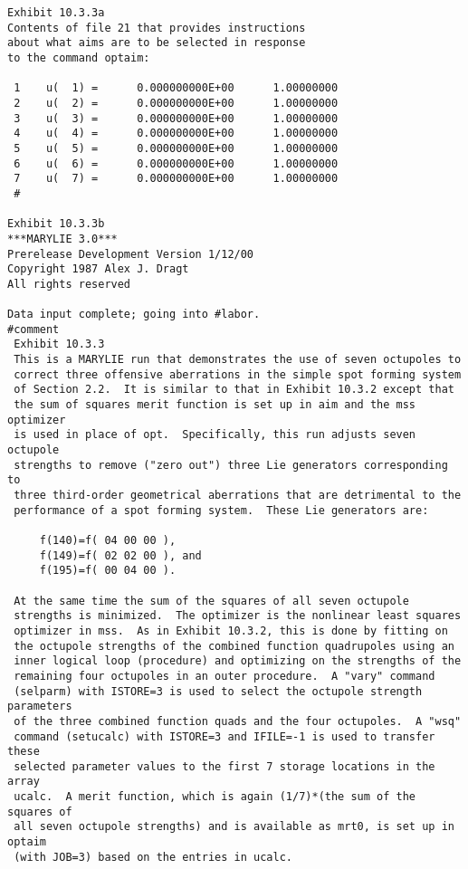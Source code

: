 \begin{footnotesize}
\begin{verbatim}
Exhibit 10.3.3a
Contents of file 21 that provides instructions
about what aims are to be selected in response
to the command optaim:

 1    u(  1) =      0.000000000E+00      1.00000000
 2    u(  2) =      0.000000000E+00      1.00000000
 3    u(  3) =      0.000000000E+00      1.00000000
 4    u(  4) =      0.000000000E+00      1.00000000
 5    u(  5) =      0.000000000E+00      1.00000000
 6    u(  6) =      0.000000000E+00      1.00000000
 7    u(  7) =      0.000000000E+00      1.00000000
 #

Exhibit 10.3.3b
***MARYLIE 3.0***
Prerelease Development Version 1/12/00
Copyright 1987 Alex J. Dragt
All rights reserved

Data input complete; going into #labor.
#comment
 Exhibit 10.3.3
 This is a MARYLIE run that demonstrates the use of seven octupoles to
 correct three offensive aberrations in the simple spot forming system
 of Section 2.2.  It is similar to that in Exhibit 10.3.2 except that
 the sum of squares merit function is set up in aim and the mss optimizer
 is used in place of opt.  Specifically, this run adjusts seven octupole
 strengths to remove ("zero out") three Lie generators corresponding to
 three third-order geometrical aberrations that are detrimental to the
 performance of a spot forming system.  These Lie generators are:

     f(140)=f( 04 00 00 ),
     f(149)=f( 02 02 00 ), and
     f(195)=f( 00 04 00 ).

 At the same time the sum of the squares of all seven octupole
 strengths is minimized.  The optimizer is the nonlinear least squares
 optimizer in mss.  As in Exhibit 10.3.2, this is done by fitting on
 the octupole strengths of the combined function quadrupoles using an
 inner logical loop (procedure) and optimizing on the strengths of the
 remaining four octupoles in an outer procedure.  A "vary" command
 (selparm) with ISTORE=3 is used to select the octupole strength parameters
 of the three combined function quads and the four octupoles.  A "wsq"
 command (setucalc) with ISTORE=3 and IFILE=-1 is used to transfer these
 selected parameter values to the first 7 storage locations in the array
 ucalc.  A merit function, which is again (1/7)*(the sum of the squares of
 all seven octupole strengths) and is available as mrt0, is set up in optaim
 (with JOB=3) based on the entries in ucalc.


\end{verbatim}
\end{footnotesize}
